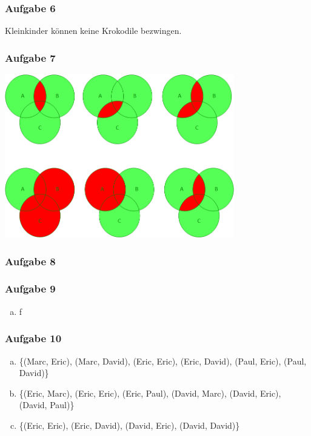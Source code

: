 \documentclass[12pt, a4paper, oneside]{article}
\begin{document}
\subsubsection{Aufgabe 6}
Kleinkinder können keine Krokodile bezwingen.

\subsubsection{Aufgabe 7} 
\begin{center}
  \includegraphics[width=0.75\textwidth]{ex3-7.png}
\end{center} 
 
\subsubsection{Aufgabe 8}

\subsubsection{Aufgabe 9}
\begin{enumerate}[(a)]
  \item f
\end{enumerate}


\subsubsection{Aufgabe 10}
\begin{enumerate}[(a)]
  \item \{(Marc, Eric), (Marc, David), (Eric, Eric), (Eric, David), (Paul, Eric), (Paul, David)\}
  \item \{(Eric, Marc), (Eric, Eric), (Eric, Paul), (David, Marc), (David, Eric), (David, Paul)\}
  \item \{(Eric, Eric), (Eric, David), (David, Eric), (David, David)\}
\end{enumerate}

 
\end{document}
